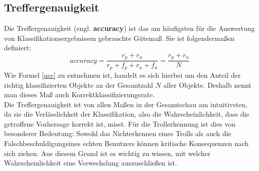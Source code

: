 \subsection{Treffergenauigkeit}
Die Treffergenauigkeit (engl. \textbf{accuracy}) ist das am häufigsten für die Auswertung von Klassifikationsergebnissen gebrauchte Gütemaß. Sie ist folgendermaßen definiert:
\begin{equation}
	accuracy = \frac{r_p + r_n}{r_p + f_p + r_n + f_n} = \frac{r_p + r_n}{N}
	\label{acc}
\end{equation}
Wie Formel \ref{acc} zu entnehmen ist, handelt es sich hierbei um den Anteil der richtig klassifizierten Objekte an der Gesamtzahl $N$ aller Objekte. Deshalb nennt man dieses Maß auch Korrektklassifizierungsrate.\\
Die Treffergenauigkeit ist von allen Maßen in der Gesamtschau am intuitivsten, da sie die Verlässlichkeit der Klassifikation, also die Wahrscheinlichkeit, dass die getroffene Vorhersage korrekt ist, misst. Für die Trollerkennung ist dies von besonderer Bedeutung: Sowohl das Nichterkennen eines Trolls als auch die \glqq Falschbeschuldigung\grqq eines echten Benutzers können kritische Konsequenzen nach sich ziehen. Aus diesem Grund ist es wichtig zu wissen, mit welcher Wahrscheinlichkeit eine Verwechslung auszuschließen ist. 
